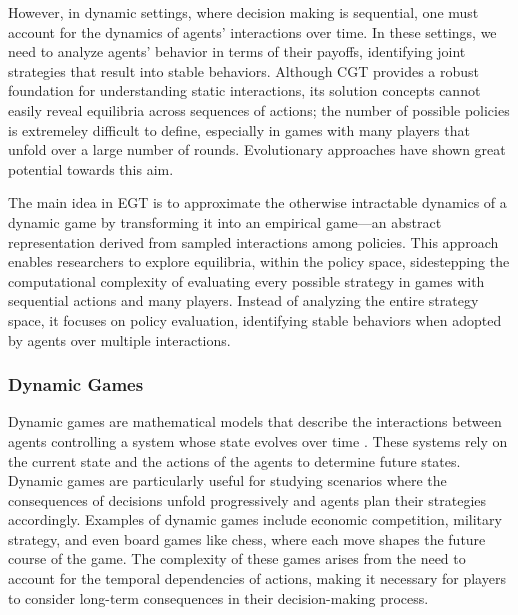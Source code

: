     \noindent
    However, in dynamic settings, where decision making is sequential, one must account for the dynamics of agents' interactions over time. In these settings, we need to analyze agents' behavior in terms of their payoffs, identifying joint strategies that result into stable behaviors. Although CGT provides a robust foundation for understanding static interactions, its solution concepts cannot easily reveal equilibria across sequences of actions; the number of possible policies is extremeley difficult to define, especially in games with many players that unfold over a large number of rounds. Evolutionary approaches have shown great potential towards this aim.\tinydouble

    \noindent
    The main idea in EGT is to approximate the otherwise intractable dynamics of a dynamic game by transforming it into an empirical game—an abstract representation derived from sampled interactions among policies. This approach enables researchers to explore equilibria, within the policy space, sidestepping the computational complexity of evaluating every possible strategy in games with sequential actions and many players. Instead of analyzing the entire strategy space, it focuses on policy evaluation, identifying stable behaviors when adopted by agents over multiple interactions.
    
    \subsubsection{Dynamic Games}

        Dynamic games are mathematical models that describe the interactions between agents controlling a system whose state evolves over time \cite{dynamicgames/krawczyk-jacek}. These systems rely on the current state and the actions of the agents to determine future states. Dynamic games are particularly useful for studying scenarios where the consequences of decisions unfold progressively and agents plan their strategies accordingly. Examples of dynamic games include economic competition, military strategy, and even board games like chess, where each move shapes the future course of the game. The complexity of these games arises from the need to account for the temporal dependencies of actions, making it necessary for players to consider long-term consequences in their decision-making process.\tinydouble


